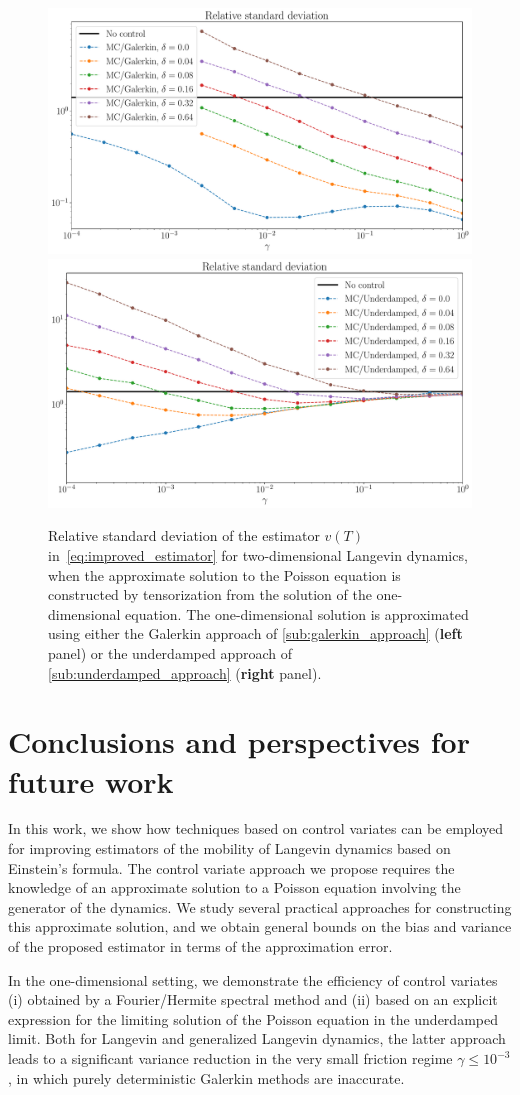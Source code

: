 \documentclass[11pt,a4paper]{article}
\begin{document}
\begin{figure}[ht]
    \centering
    \includegraphics[width=0.49\linewidth]{figures/var-delta-galerkin.pdf}
    \includegraphics[width=0.49\linewidth]{figures/var-delta-underdamped.pdf}
    \caption{
        Relative standard deviation of the estimator $v(T)$ in~\eqref{eq:improved_estimator} for two-dimensional Langevin dynamics,
        when the approximate solution to the Poisson equation is constructed by tensorization from the solution of the one-dimensional equation.
        The one-dimensional solution is approximated using either the Galerkin approach of \cref{sub:galerkin_approach} (\textbf{left} panel)
        or the underdamped approach of \cref{sub:underdamped_approach} (\textbf{right} panel).
    }%
    \label{fig:time_bias_deviation_2d}
\end{figure}

\section{Conclusions and perspectives for future work}%
\label{sec:conclusions_and_perspectives_for_future_work}
In this work,
we show how techniques based on control variates can be employed for improving estimators of the mobility of Langevin dynamics based on Einstein's formula.
The control variate approach we propose requires the knowledge of an approximate solution to a Poisson equation involving the generator of the dynamics.
We study several practical approaches for constructing this approximate solution,
and we obtain general bounds on the bias and variance of the proposed estimator in terms of the approximation error.

In the one-dimensional setting,
we demonstrate the efficiency of control variates
(i) obtained by a Fourier/Hermite spectral method and
(ii) based on an explicit expression for the limiting solution of the Poisson equation in the underdamped limit.
Both for Langevin and generalized Langevin dynamics,
the latter approach leads to a significant variance reduction in the very small friction regime $\gamma \leq 10^{-3}$,
in which purely deterministic Galerkin methods are inaccurate.
\end{document}
